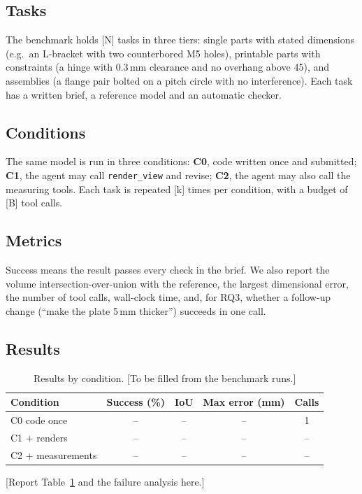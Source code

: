 \documentclass[lineno]{asmejour}
\begin{document}
\subsection{Tasks}
The benchmark holds [N] tasks in three tiers: single parts with stated dimensions (e.g.\ an L-bracket with two counterbored M5 holes), printable parts with constraints (a hinge with 0.3\,mm clearance and no overhang above 45\textdegree), and assemblies (a flange pair bolted on a pitch circle with no interference). Each task has a written brief, a reference model and an automatic checker.

\subsection{Conditions}
The same model is run in three conditions: \textbf{C0}, code written once and submitted; \textbf{C1}, the agent may call \texttt{render\_view} and revise; \textbf{C2}, the agent may also call the measuring tools. Each task is repeated [k] times per condition, with a budget of [B] tool calls.

\subsection{Metrics}
Success means the result passes every check in the brief. We also report the volume intersection-over-union with the reference, the largest dimensional error, the number of tool calls, wall-clock time, and, for RQ3, whether a follow-up change (``make the plate 5\,mm thicker'') succeeds in one call.

\subsection{Results}
\begin{table}[t]
\caption{Results by condition. [To be filled from the benchmark runs.]}
\label{tab:results}
\centering\small
\begin{tabular}{lcccc}
\toprule
Condition & Success (\%) & IoU & Max error (mm) & Calls \\
\midrule
C0 code once & -- & -- & -- & 1 \\
C1 + renders & -- & -- & -- & -- \\
C2 + measurements & -- & -- & -- & -- \\
\bottomrule
\end{tabular}
\end{table}

[Report Table~\ref{tab:results} and the failure analysis here.]
\end{document}
